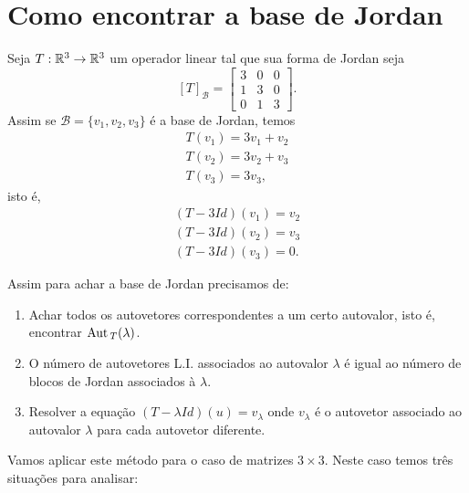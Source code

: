 
\section{Como encontrar a base de Jordan} %
\label{sec:base_de_jordan}

Seja $T : \mathbb{R}^3 \to \mathbb{R}^3$ um operador linear tal que sua forma de Jordan seja
\[
	[T]_\mathcal{B} = \begin{bmatrix}
		3 & 0 & 0\\
		1 & 3 & 0\\
		0 & 1 & 3
	\end{bmatrix}.
\]
Assim se $\mathcal{B} = \{v_1, v_2, v_3\}$ \'e a base de Jordan, temos
\begin{align*}
	T(v_1) = 3v_1 + v_2\\
	T(v_2) = 3v_2 + v_3\\
	T(v_3) = 3v_3,
\end{align*}
isto \'e,
\begin{align*}
	(T- 3Id)(v_1) = v_2\\
	(T - 3Id)(v_2) = v_3\\
	(T - 3Id)(v_3) = 0.
\end{align*}

Assim para achar a base de Jordan precisamos de:
\begin{enumerate}
	\item Achar todos os autovetores correspondentes a um certo autovalor, isto \'e, encontrar ${\rm Aut\,}_T(\lambda)$.
	\item O n\'umero de autovetores L.I. associados ao autovalor $\lambda$ \'e igual ao n\'umero de blocos de Jordan associados \`a $\lambda$.
	\item Resolver a equa\c{c}\~ao $(T - \lambda Id)(u) = v_\lambda$ onde $v_\lambda$ \'e o autovetor associado ao autovalor $\lambda$ para cada autovetor diferente.
\end{enumerate}

Vamos aplicar este m\'etodo para o caso de matrizes $3 \times 3$. Neste caso temos tr\^es situa\c{c}\~oes para analisar:

